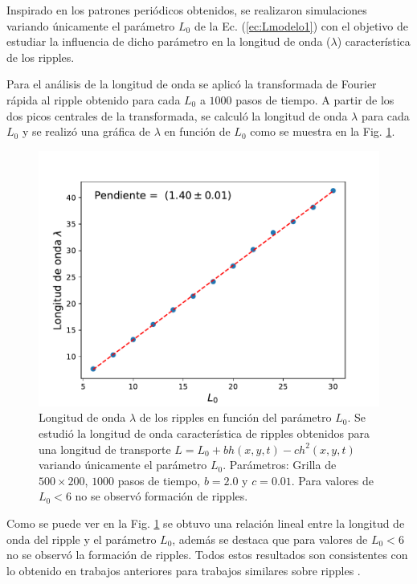 \documentclass[11pt,twocolumn,twoside]{opticajnl}
\begin{document}
Inspirado en los patrones periódicos obtenidos, se realizaron simulaciones variando únicamente el parámetro $L_0$ de la Ec. (\ref{ec:Lmodelo1}) con el objetivo de estudiar la influencia de dicho parámetro en la longitud de onda ($\lambda$) característica de los ripples. 

Para el análisis de la longitud de onda se aplicó la transformada de Fourier rápida al ripple obtenido para cada $L_0$ a $1000$ pasos de tiempo. A partir de los dos picos centrales de la transformada, se calculó la longitud de onda $\lambda$ para cada $L_0$ y se realizó una gráfica de $\lambda$ en función de $L_0$ como se muestra en la Fig. \ref{fig:lambdavsL}.

\begin{figure}[H]
\centering
\includegraphics[width=\linewidth]{Figuras/fvsL0.pdf}
\caption{Longitud de onda $\lambda$ de los ripples en función del parámetro $L_0$. Se estudió la longitud de onda característica de ripples obtenidos para una longitud de transporte $L = L_0 + bh(x,y,t) - ch^2(x,y,t)$ variando únicamente el parámetro $L_0$. Parámetros: Grilla de $500 \times 200$, $1000$ pasos de tiempo, $b=2.0$ y $c=0.01$. Para valores de $L_0 < 6$ no se observó formación de ripples.}
\label{fig:lambdavsL}
\end{figure}

Como se puede ver en la Fig. \ref{fig:lambdavsL} se obtuvo una relación lineal entre la longitud de onda del ripple y el parámetro $L_0$, además se destaca que para valores de $L_0 < 6$ no se observó la formación de ripples. Todos estos resultados son consistentes con lo obtenido en trabajos anteriores para trabajos similares sobre ripples \cite{nishimori_formation_1993}.
\end{document}
